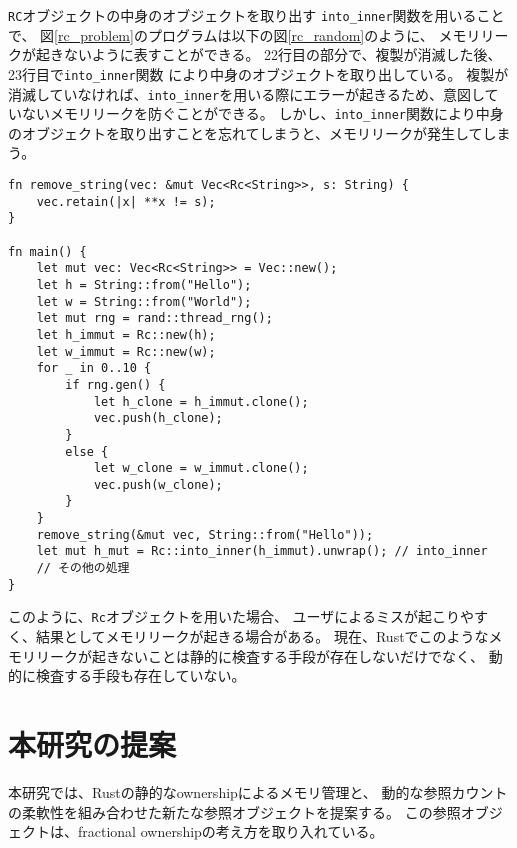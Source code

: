 \documentclass{sumiilab-paper}
\theoremstyle{mystyle}
\numberwithin{definition}{chapter} %
\begin{document}
\texttt{RC}オブジェクトの中身のオブジェクトを取り出す
\texttt{into\_inner}関数を用いることで、
図\ref{rc_problem}のプログラムは以下の図\ref{rc_random}のように、
メモリリークが起きないように表すことができる。
22行目の部分で、複製が消滅した後、23行目で\texttt{into\_inner}関数
により中身のオブジェクトを取り出している。
複製が消滅していなければ、\texttt{into\_inner}を用いる際にエラーが起きるため、意図していないメモリリークを防ぐことができる。
しかし、\texttt{into\_inner}関数により中身のオブジェクトを取り出すことを忘れてしまうと、メモリリークが発生してしまう。
\begin{lstlisting}[caption=into\_inner関数を用いた例, 
  label=rc_random, captionpos=b]
fn remove_string(vec: &mut Vec<Rc<String>>, s: String) {
    vec.retain(|x| **x != s);
}

fn main() {
    let mut vec: Vec<Rc<String>> = Vec::new();
    let h = String::from("Hello");
    let w = String::from("World");
    let mut rng = rand::thread_rng();
    let h_immut = Rc::new(h);
    let w_immut = Rc::new(w);
    for _ in 0..10 {
        if rng.gen() {
            let h_clone = h_immut.clone();
            vec.push(h_clone);
        }
        else {
            let w_clone = w_immut.clone();
            vec.push(w_clone);
        }
    }
    remove_string(&mut vec, String::from("Hello"));
    let mut h_mut = Rc::into_inner(h_immut).unwrap(); // into_inner
    // その他の処理
}
\end{lstlisting}

このように、\texttt{Rc}オブジェクトを用いた場合、
ユーザによるミスが起こりやすく、結果としてメモリリークが起きる場合がある。
現在、Rustでこのようなメモリリークが起きないことは静的に検査する手段が存在しないだけでなく、
動的に検査する手段も存在していない。

\chapter{本研究の提案}
本研究では、Rustの静的なownershipによるメモリ管理と、
動的な参照カウントの柔軟性を組み合わせた新たな参照オブジェクトを提案する。
この参照オブジェクトは、fractional ownershipの考え方を取り入れている。
\end{document}
